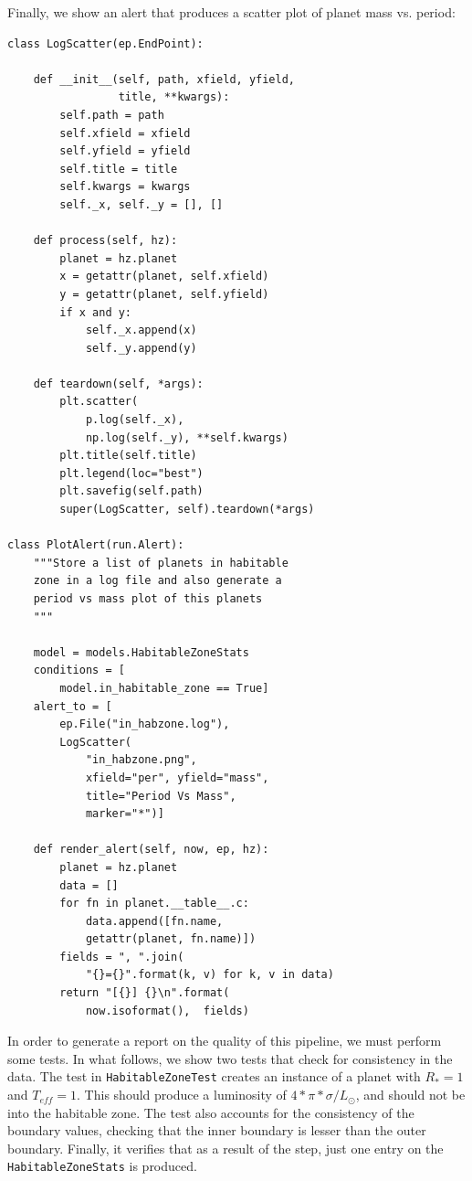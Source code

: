 \documentclass[final,5p,times,twocolumn,authoryear]{elsarticle}
\begin{document}
Finally, we show an alert that produces a scatter plot of planet mass vs. period:

\begin{verbatim}
class LogScatter(ep.EndPoint):

    def __init__(self, path, xfield, yfield,
                 title, **kwargs):
        self.path = path
        self.xfield = xfield
        self.yfield = yfield
        self.title = title
        self.kwargs = kwargs
        self._x, self._y = [], []

    def process(self, hz):
        planet = hz.planet
        x = getattr(planet, self.xfield)
        y = getattr(planet, self.yfield)
        if x and y:
            self._x.append(x)
            self._y.append(y)

    def teardown(self, *args):
        plt.scatter(
            p.log(self._x),
            np.log(self._y), **self.kwargs)
        plt.title(self.title)
        plt.legend(loc="best")
        plt.savefig(self.path)
        super(LogScatter, self).teardown(*args)

class PlotAlert(run.Alert):
    """Store a list of planets in habitable
    zone in a log file and also generate a
    period vs mass plot of this planets
    """

    model = models.HabitableZoneStats
    conditions = [
        model.in_habitable_zone == True]
    alert_to = [
        ep.File("in_habzone.log"),
        LogScatter(
            "in_habzone.png",
            xfield="per", yfield="mass",
            title="Period Vs Mass",
            marker="*")]

    def render_alert(self, now, ep, hz):
        planet = hz.planet
        data = []
        for fn in planet.__table__.c:
            data.append([fn.name,
            getattr(planet, fn.name)])
        fields = ", ".join(
            "{}={}".format(k, v) for k, v in data)
        return "[{}] {}\n".format(
            now.isoformat(),  fields)
\end{verbatim}

In order to generate a report on the quality of this pipeline, we must perform some tests.
%
In what follows, we show two tests that check for consistency in the data.
%
The test in \verb|HabitableZoneTest| creates an instance of a planet with $R_{\ast}=1$ and $T_{eff}=1$.
%
This should produce a luminosity of $4*\pi*\sigma/L_{\odot}$, and should not be into the habitable zone.
%
The test also accounts for the consistency of the boundary values, checking that
the inner boundary is lesser than the outer boundary.
%
Finally, it verifies that as a result of the step, just one entry on the \verb|HabitableZoneStats| is produced.
\end{document}
